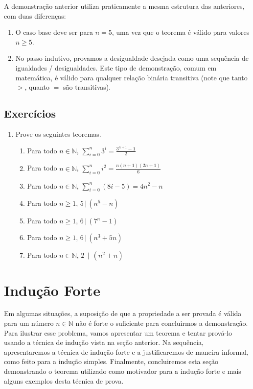 \begin{Commentary}
A demonstração anterior utiliza praticamente a mesma estrutura das
anteriores, com duas diferenças:
\begin{enumerate}
  \item O caso base deve ser para $n = 5$, uma vez que o teorema é
    válido para valores $n \geq 5$.
  \item No passo indutivo, provamos a desigualdade desejada como uma
    sequência de igualdades / desigualdades. Este tipo de
    demonstração, comum em matemática, é válido para qualquer relação
    binária transitiva (note que tanto $>$, quanto $=$ são transitivas).
\end{enumerate}
\end{Commentary}

\subsection{Exercícios}

\begin{enumerate}
	\item Prove os seguintes teoremas.
	\begin{enumerate}
		\item Para todo $n\in\mathbb{N}$, $\sum_{i=0}^{n}3^i = \frac{3^{n + 1} - 1}{2}$
		\item Para todo $n\in\mathbb{N}$, $\sum_{i=0}^{n}i^{2} =
                  \frac{n(n+1)(2n + 1)}{6}$
                \item Para todo $n\in\mathbb{N}$, $\sum_{i=0}^{n}(8i - 5) =
                  4n^2 - n$
                \item Para todo $n\geq 1$, $5\,|\,(n^5-n)$
                \item Para todo $n\geq 1$, $6\,|\,(7^n-1)$
                \item Para todo $n\geq 1$, $6\,|\,(n^3+5n)$
		\item Para todo $n\in\mathbb{N}$, $2\,\mid\,(n^{2} + n)$
	\end{enumerate}
\end{enumerate}

\section{Indução Forte}

Em algumas situações, a suposição de que a propriedade a ser provada é
válida para um número $n \in \mathbb{N}$ não é forte o suficiente para
concluirmos a demonstração.  Para ilustrar esse problema, vamos
apresentar um teorema e tentar prová-lo usando a técnica de indução
vista na seção anterior. Na sequência, apresentaremos a técnica de indução forte
e a justificaremos de maneira informal, como feito para a indução
simples. Finalmente, concluiremos esta seção demonstrando o teorema
utilizado como motivador para a indução forte e mais alguns exemplos
desta técnica de prova.

